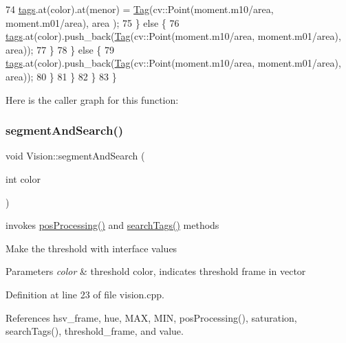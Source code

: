 \begin{DoxyCode}
74                     \hyperlink{class_vision_acc5bbdf18ba36cc516c17999308be267}{tags}.at(color).at(menor) = \hyperlink{class_tag}{Tag}(cv::Point(moment.m10/area, moment.m01/area), area
      );
75                 \} \textcolor{keywordflow}{else} \{
76                   \hyperlink{class_vision_acc5bbdf18ba36cc516c17999308be267}{tags}.at(color).push\_back(\hyperlink{class_tag}{Tag}(cv::Point(moment.m10/area, moment.m01/area), area));
77                 \}
78             \} \textcolor{keywordflow}{else} \{
79                 \hyperlink{class_vision_acc5bbdf18ba36cc516c17999308be267}{tags}.at(color).push\_back(\hyperlink{class_tag}{Tag}(cv::Point(moment.m10/area, moment.m01/area), area));
80             \}
81         \}
82     \}
83 \}
\end{DoxyCode}
Here is the caller graph for this function\+:
\mbox{\label{class_vision_a0e43481439b4b670f5dd66caefa09494}} 
\subsubsection{\texorpdfstring{segment\+And\+Search()}{segmentAndSearch()}}
{\footnotesize\ttfamily void Vision\+::segment\+And\+Search (\begin{DoxyParamCaption}\item[{int}]{color }\end{DoxyParamCaption})\hspace{0.3cm}{\ttfamily [private]}}



invokes \hyperlink{class_vision_af00cb00dca3916c4beebbd140ec8b153}{pos\+Processing()} and \hyperlink{class_vision_a717cabba99a7e8d5613df6dc699e31fe}{search\+Tags()} methods 

Make the threshold with interface values 
\begin{DoxyParams}{Parameters}
{\em color} & threshold color, indicates threshold frame in vector \\
\hline
\end{DoxyParams}


Definition at line 23 of file vision.\+cpp.



References hsv\+\_\+frame, hue, M\+AX, M\+IN, pos\+Processing(), saturation, search\+Tags(), threshold\+\_\+frame, and value.



